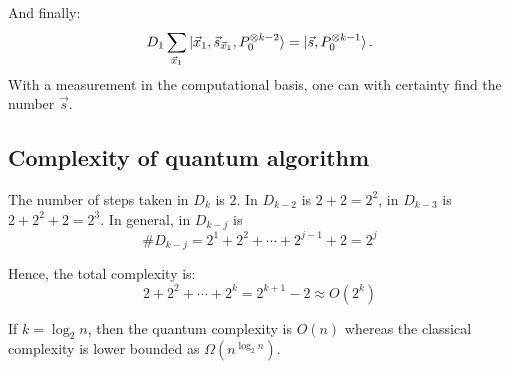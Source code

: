 \documentclass{article}
\begin{document}
And finally:
\begin{equation}
  D_1 \sum_{\vec{x}_1}\ket{\vec{x}_1, \vec{s}_{\vec{x}_1}, P_0^{\otimes k-2}} =
  \ket{\vec{s}, P_0^{\otimes k-1}}.
\end{equation}
With a measurement in the computational basis, one can with certainty find the
number $\vec{s}$.

\subsection{Complexity of quantum algorithm}
\label{sec:Complexity of quantum algorithm}
The number of steps taken in $D_k$ is $2$. In $D_{k-2}$ is $2+2=2^2$, in
$D_{k-3}$ is $2+2^2+2=2^3$. In general, in $D_{k-j}$ is
\begin{equation}
  \# D_{k-j} = 2^1 + 2^2 + \cdots + 2^{j-1} + 2 = 2^j
\end{equation}

Hence, the total complexity is:
\begin{equation}
  2 + 2^2 + \cdots + 2^k = 2^{k+1}-2 \approx O(2^k)
\end{equation}

If $k=\log_2 n$, then the quantum complexity is $O(n)$ whereas the classical
complexity is lower bounded as $\Omega(n^{\log_2 n})$.
\end{document}
